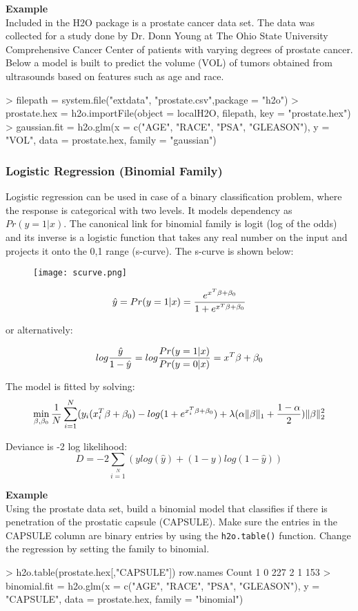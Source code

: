 \documentclass[11pt]{article}
\begin{document}
\textbf{Example}\\
Included in the H2O package is a prostate cancer data set. The data was collected for a study done by Dr. Donn Young at The Ohio State University Comprehensive Cancer Center of patients with varying degrees of prostate cancer. Below a model is built to predict the volume (VOL) of tumors obtained from ultrasounds based on features such as age and race.

\begin{spverbatim}
> filepath = system.file("extdata", "prostate.csv",package = "h2o")
> prostate.hex = h2o.importFile(object = localH2O, filepath, key = "prostate.hex")
> gaussian.fit = h2o.glm(x = c("AGE", "RACE", "PSA", "GLEASON"), y = "VOL", data = prostate.hex, family = "gaussian")
\end{spverbatim}

\subsubsection{Logistic Regression (Binomial Family)}
Logistic regression can be used in case of a binary classification problem, where the response is categorical with two levels. It models dependency as $Pr(y = 1|x)$. The canonical link for binomial family is logit (log of the odds) and its inverse is a logistic function that takes any real number on the input and projects it onto the 0,1 range (s-curve).  The s-curve is shown below: 

\begin{figure}[h]
\centering
\texttt{[image: scurve.png]}
\end{figure}


 

\[ \hat{y} = Pr(y = 1|x) = {e^{x^T\beta + \beta_0} \over 1 + e^{x^T \beta + \beta_0} } \]

or alternatively:


\[log {\hat{y} \over 1- \hat{y}} = log{Pr(y=1|x) \over Pr(y=0|x)} = x^T \beta + \beta_0\]

The model is fitted by solving:
\[  \min\limits_{\beta,\beta_0} { {1 \over N}\sum\limits_{i=1}\limits^{N}(y_i (x_i^{T}\beta  + \beta_0) - log (1 + e^{x_i^{T}\beta  + \beta_0} )  + \lambda (\alpha \|\beta \|_1 + {1-\alpha \over 2}) \| \beta \|_2^2} \]

Deviance is -2 log likelihood:
\[D = -2\sum\limits_{i=1}\limits^{N}{(y log(\hat{y}) + (1 - y)log(1-\hat{y})  )}\]

\textbf{Example}\\
Using the prostate data set, build a binomial model that classifies if there is penetration of the prostatic capsule (CAPSULE). Make sure the entries in the CAPSULE column are binary entries by using the \texttt{h2o.table()} function. Change the regression by setting the family to binomial.
\begin{spverbatim}
> h2o.table(prostate.hex[,"CAPSULE"])
  row.names Count
1         0   227
2         1   153
> binomial.fit = h2o.glm(x = c("AGE", "RACE", "PSA", "GLEASON"), y = "CAPSULE", data = prostate.hex, family = "binomial")
\end{spverbatim}
\end{document}
